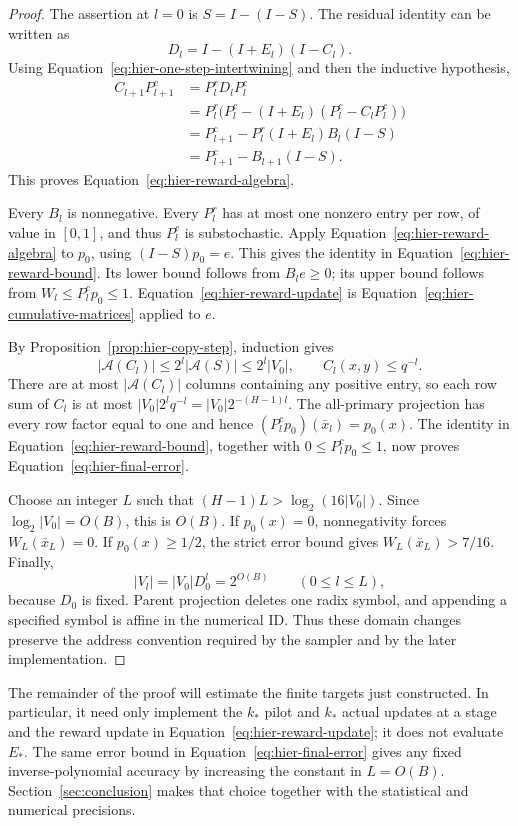 \begin{proof}
The assertion at $l=0$ is $S=I-(I-S)$.  The residual identity can be
written as
\[
 D_l=I-(I+E_l)(I-C_l).
\]
Using Equation~\eqref{eq:hier-one-step-intertwining} and then the
inductive hypothesis,
\begin{align*}
 C_{l+1}P_{l+1}^c
 &=P_l^rD_lP_l^c\\
 &=P_l^r\bigl(P_l^c-(I+E_l)(P_l^c-C_lP_l^c)\bigr)\\
 &=P_{l+1}^c-P_l^r(I+E_l)B_l(I-S)\\
 &=P_{l+1}^c-B_{l+1}(I-S).
\end{align*}
This proves Equation~\eqref{eq:hier-reward-algebra}.

Every $B_l$ is nonnegative.  Every $P_l^r$ has at most one nonzero
entry per row, of value in $[0,1]$, and thus $P_l^c$ is
substochastic.  Apply Equation~\eqref{eq:hier-reward-algebra} to
$p_0$, using $(I-S)p_0=e$.  This gives the identity in
Equation~\eqref{eq:hier-reward-bound}.  Its lower bound follows from
$B_le\geq0$; its upper bound follows from
$W_l\leq P_l^cp_0\leq1$.  Equation~\eqref{eq:hier-reward-update}
is Equation~\eqref{eq:hier-cumulative-matrices} applied to $e$.

By Proposition~\ref{prop:hier-copy-step}, induction gives
\[
 |\mathcal A(C_l)|\leq2^l|\mathcal A(S)|\leq2^l|V_0|,
 \qquad C_l(x,y)\leq q^{-l}.
\]
There are at most $|\mathcal A(C_l)|$ columns containing any positive
entry, so each row sum of $C_l$ is at most
$|V_0|2^lq^{-l}=|V_0|2^{-(H-1)l}$.
The all-primary projection has every row factor equal to one and hence
$(P_l^cp_0)(\bar x_l)=p_0(x)$.  The identity in
Equation~\eqref{eq:hier-reward-bound}, together with
$0\leq P_l^cp_0\leq1$, now proves
Equation~\eqref{eq:hier-final-error}.

Choose an integer $L$ such that
$(H-1)L>\log_2(16|V_0|)$.  Since $\log_2|V_0|=O(B)$, this is
$O(B)$.  If $p_0(x)=0$, nonnegativity forces
$W_L(\bar x_L)=0$.  If $p_0(x)\geq1/2$, the strict error bound
gives $W_L(\bar x_L)>7/16$.  Finally,
\[
 |V_l|=|V_0|D_0^l=2^{O(B)}\qquad(0\leq l\leq L),
\]
because $D_0$ is fixed.  Parent projection deletes one radix symbol,
and appending a specified symbol is affine in the numerical ID.  Thus
these domain changes preserve the address convention required by the
sampler and by the later implementation.
\end{proof}

The remainder of the proof will estimate the finite targets just
constructed.  In particular, it need only implement the $k_*$ pilot and
$k_*$ actual updates at a stage and the reward update in
Equation~\eqref{eq:hier-reward-update}; it does not evaluate $E_*$.
The same error bound in Equation~\eqref{eq:hier-final-error} gives any
fixed inverse-polynomial accuracy by increasing the constant in
$L=O(B)$.  Section~\ref{sec:conclusion} makes that choice together with
the statistical and numerical precisions.
